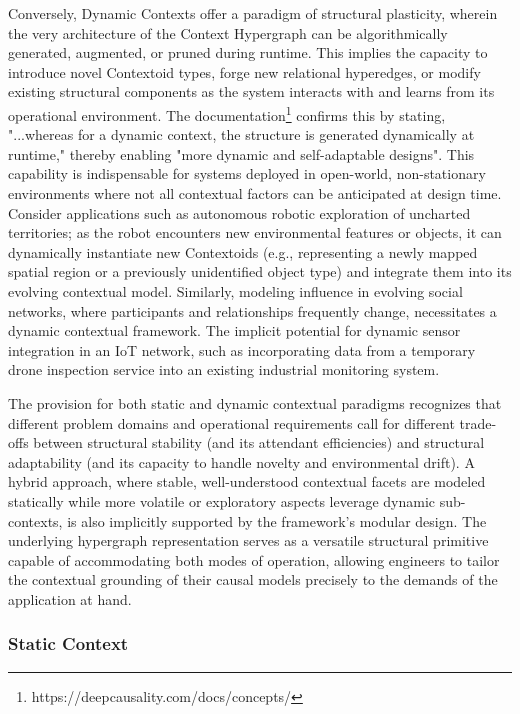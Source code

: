 Conversely, Dynamic Contexts offer a paradigm of structural plasticity, wherein the very architecture of the Context Hypergraph can be algorithmically generated, augmented, or pruned during runtime. This implies the capacity to introduce novel Contextoid types, forge new relational hyperedges, or modify existing structural components as the system interacts with and learns from its operational environment. The documentation\footnote{https://deepcausality.com/docs/concepts/} confirms this by stating, "...whereas for a dynamic context, the structure is generated dynamically at runtime," thereby enabling "more dynamic and self-adaptable designs". This capability is indispensable for systems deployed in open-world, non-stationary environments where not all contextual factors can be anticipated at design time. Consider applications such as autonomous robotic exploration of uncharted territories; as the robot encounters new environmental features or objects, it can dynamically instantiate new Contextoids (e.g., representing a newly mapped spatial region or a previously unidentified object type) and integrate them into its evolving contextual model. Similarly, modeling influence in evolving social networks, where participants and relationships frequently change, necessitates a dynamic contextual framework. The implicit potential for dynamic sensor integration in an IoT network, such as incorporating data from a temporary drone inspection service into an existing industrial monitoring system.

The provision for both static and dynamic contextual paradigms recognizes that different problem domains and operational requirements call for different trade-offs between structural stability (and its attendant efficiencies) and structural adaptability (and its capacity to handle novelty and environmental drift). A hybrid approach, where stable, well-understood contextual facets are modeled statically while more volatile or exploratory aspects leverage dynamic sub-contexts, is also implicitly supported by the framework's modular design. The underlying hypergraph representation serves as a versatile structural primitive capable of accommodating both modes of operation, allowing engineers to tailor the contextual grounding of their causal models precisely to the demands of the application at hand.

\subsubsection{Static Context}
\label{subsubsec:adv_static_context}


